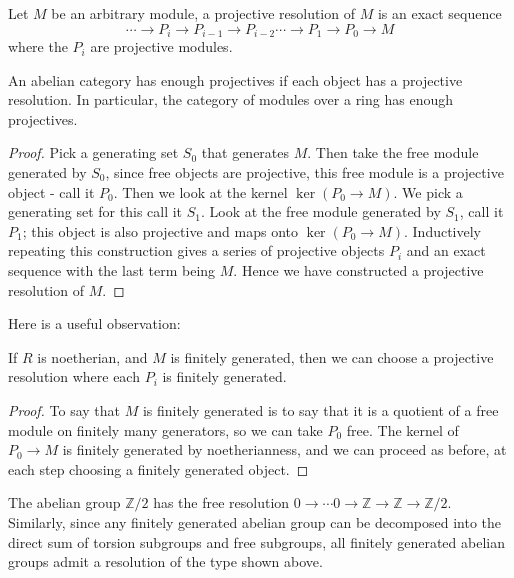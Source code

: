 \begin{definition} Let $M$ be an arbitrary module, a projective
resolution of
$M$ is an exact sequence
\begin{equation} \cdots\rightarrow P_i\rightarrow
P_{i-1}\rightarrow
P_{i-2}\cdots\rightarrow P_1\rightarrow P_0\rightarrow M
\end{equation} where
the $P_i$ are projective modules. \end{definition}


\begin{theorem}An abelian category has enough projectives if
each object has a
projective resolution. In particular, the category of modules
over a ring has
enough projectives. \end{theorem}
\begin{proof} Pick a generating set $S_0$ that generates $M$.
Then take the free
module generated by $S_0$, since free objects are projective,
this free module
is a projective object - call it $P_0$. Then we look at the
kernel
$\ker(P_0\rightarrow M)$. We pick a generating set for this call
it $S_1$. Look
at the free module generated by $S_1$, call it $P_1$; this
object is also
projective and maps onto $\ker(P_0\rightarrow M)$. Inductively
repeating this
construction gives a series of projective objects $P_i$ and an
exact sequence
with the last term being $M$. Hence we have constructed a
projective resolution
of $M$. \end{proof}

Here is a useful observation:
\begin{proposition} 
If $R$ is noetherian, and $M$ is finitely generated, then we can
choose a
projective resolution where each $P_i$ is finitely generated. 
\end{proposition} 
\begin{proof} 
To say that $M$ is finitely generated is to say that it is a
quotient of a free module on
finitely many generators, so we can take $P_0$ free. The kernel
of $P_0 \to M$
is finitely generated by noetherianness, and we can proceed as
before, at each step
choosing a finitely generated object. 
\end{proof} 
\begin{example} The abelian group $\mathbb{Z}/2$ has the free
resolution $0\rightarrow\cdots
0\rightarrow\mathbb{Z}\rightarrow\mathbb{Z}\rightarrow\mathbb{Z}/2$.
Similarly, since any finitely generated abelian group can be
decomposed into the direct sum of torsion subgroups and free
subgroups, all finitely generated abelian groups admit a
resolution of the type shown above.\end{example}

